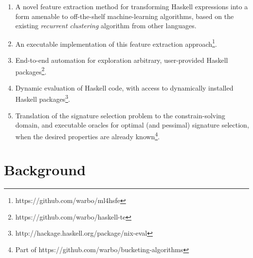 \begin{enumerate}
\item A novel feature extraction method for transforming Haskell expressions
  into a form amenable to off-the-shelf machine-learning algorithms, based on
  the existing \emph{recurrent clustering} algorithm from other languages.
\item An executable implementation of this feature extraction
  approach\footnote{https://github.com/warbo/ml4hsfe}.
\item End-to-end automation for exploration arbitrary, user-provided Haskell
  packages\footnote{https://github.com/warbo/haskell-te}.
\item Dynamic evaluation of Haskell code, with access to dynamically installed
  Haskell packages\footnote{http://hackage.haskell.org/package/nix-eval}.
\item Translation of the signature selection problem to the constrain-solving domain, and
  executable oracles for optimal (and pessimal) signature selection, when the desired
  properties are already known\footnote{Part of
    https://github.com/warbo/bucketing-algorithms}.
\end{enumerate}

\iffalse
We describe theory exploration in more detail, as well as the \qspec{} tool we
use in our experiments, in \S~\ref{sec:theoryexploration}. We introduce the
signature selection problem more formally in \S~\ref{sec:sigselect} and measure its
effect on theory exploration systems in \S~\ref{sec:implementation}. In
\S~\ref{sec:clustering} we highlight the difference between signature selection and the
well-known \emph{clustering problem} from machine learning, by demonstrating
that clustering algorithms perform poorly at signature selection.  A variety of related
work is surveyed in \S~\ref{sec:related} and we conclude in
\S~\ref{sec:conclusion} with potential directions for future research.
\fi

\section{Background}
\label{sec:background}

